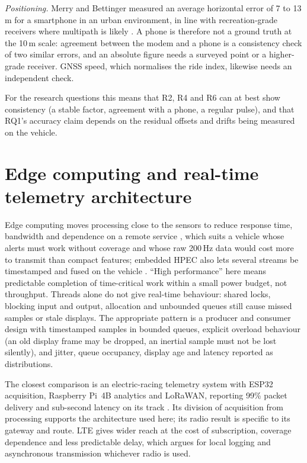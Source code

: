\emph{Positioning.} Merry and Bettinger measured an average horizontal error of 7 to 13\,m for a smartphone in an urban environment, in line with recreation-grade receivers where multipath is likely \cite{merry2019}. A phone is therefore not a ground truth at the 10\,m scale: agreement between the modem and a phone is a consistency check of two similar errors, and an absolute figure needs a surveyed point or a higher-grade receiver. GNSS speed, which normalises the ride index, likewise needs an independent check.

For the research questions this means that R2, R4 and R6 can at best show consistency (a stable factor, agreement with a phone, a regular pulse), and that RQ1's accuracy claim depends on the residual offsets and drifts being measured on the vehicle.

\section{Edge computing and real-time telemetry architecture}
\label{sec:lit-edge}

Edge computing moves processing close to the sensors to reduce response time, bandwidth and dependence on a remote service \cite{shi2016}, which suits a vehicle whose alerts must work without coverage and whose raw 200\,Hz data would cost more to transmit than compact features; embedded HPEC also lets several streams be timestamped and fused on the vehicle \cite{barnell2018}. ``High performance'' here means predictable completion of time-critical work within a small power budget, not throughput. Threads alone do not give real-time behaviour: shared locks, blocking input and output, allocation and unbounded queues still cause missed samples or stale displays. The appropriate pattern is a producer and consumer design with timestamped samples in bounded queues, explicit overload behaviour (an old display frame may be dropped, an inertial sample must not be lost silently), and jitter, queue occupancy, display age and latency reported as distributions.

The closest comparison is an electric-racing telemetry system with ESP32 acquisition, Raspberry Pi~4B analytics and LoRaWAN, reporting 99\% packet delivery and sub-second latency on its track \cite{perezgonzalez2025}. Its division of acquisition from processing supports the architecture used here; its radio result is specific to its gateway and route. LTE gives wider reach at the cost of subscription, coverage dependence and less predictable delay, which argues for local logging and asynchronous transmission whichever radio is used.

